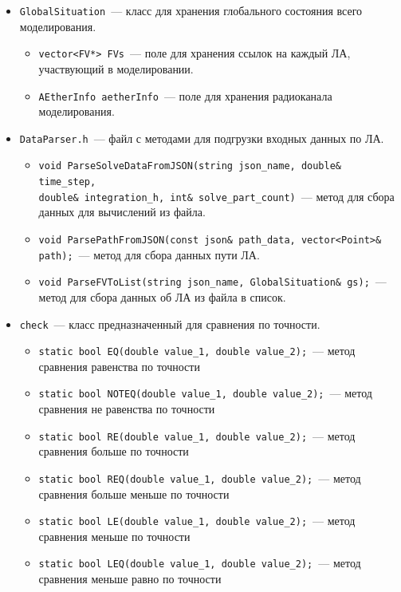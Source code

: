 \documentclass[a4paper,12pt]{article}
\begin{document}
\begin{itemize}
\begin{itemize}
    \end{itemize}
    \item \texttt{GlobalSituation}~--- класс для хранения глобального состояния всего моделирования.  
    \begin{itemize}
        \item \texttt{vector<FV*> FVs}~---  поле для хранения ссылок на каждый ЛА, участвующий в моделировании.
        \item \texttt{AEtherInfo aetherInfo}~--- поле для хранения радиоканала моделирования.
    \end{itemize}
    \item \texttt{DataParser.h}~--- файл с методами для подгрузки входных данных по ЛА.   
    \begin{itemize}
        \item \texttt{void ParseSolveDataFromJSON(string json\_name, double\& time\_step,\\ double\& integration\_h, int\& solve\_part\_count)}~--- метод для сбора данных для вычислений из файла.
        \item \texttt{void ParsePathFromJSON(const json\& path\_data, vector<Point>\& path);}~--- метод для сбора данных пути ЛА.
        \item \texttt{void ParseFVToList(string json\_name, GlobalSituation\& gs);}~--- метод для сбора данных об ЛА из файла в список.
    \end{itemize}
    \item \texttt{check}~--- класс предназначенный для сравнения по точности.   
    \begin{itemize}
        \item \texttt{static bool EQ(double value\_1, double value\_2);}~---  метод сравнения равенства по точности 
        \item \texttt{static bool NOTEQ(double value\_1, double value\_2);}~--- метод сравнения не равенства по точности
        \item \texttt{static bool RE(double value\_1, double value\_2);}~--- метод сравнения больше по точности
        \item \texttt{static bool REQ(double value\_1, double value\_2);}~--- метод сравнения больше меньше по точности
        \item \texttt{static bool LE(double value\_1, double value\_2);}~--- метод сравнения меньше по точности
        \item \texttt{static bool LEQ(double value\_1, double value\_2);}~--- метод сравнения меньше равно по точности
    \end{itemize}

\end{itemize}
\end{document}
